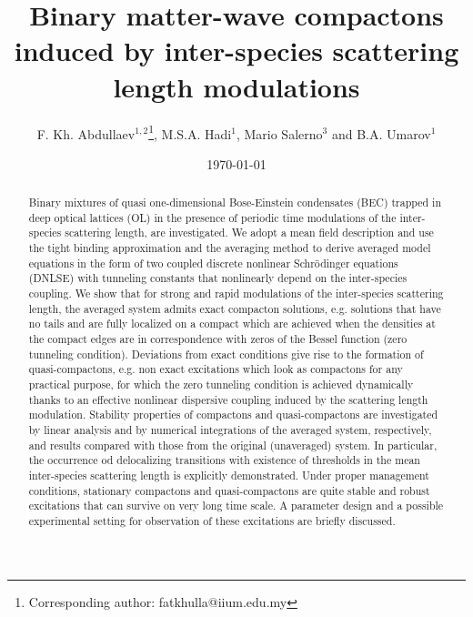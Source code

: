 \documentclass[12pt]{iopart}
\begin{document}
\title{Binary matter-wave compactons induced by inter-species scattering length modulations}
\author{F. Kh. Abdullaev$^{1,2}$\footnote{{Corresponding author: fatkhulla@iium.edu.my}}, M.S.A. Hadi$^{1}$, Mario Salerno$^{3}$ and B.A. Umarov$^{1}$
}
\address{
$^1$ Department of Physics, Kulliyyah of Science, International Islamic University Malaysia, 25200,  Kuantan, Malaysia.\\
$^2$ CCNH, Universidade Federal do ABC, 09210-170, Santo Andr\'e, Brazil.\\
$^3$ Dipartimento di Fisica ``E.R. Caianiello'', CNISM and INFN
- Gruppo Collegato di Salerno, Universit\'a di Salerno, Via Giovanni
Paolo II, 84084 Fisciano (SA), Italy.\\
}
\date{\today}

\begin{abstract}
Binary mixtures of quasi one-dimensional Bose-Einstein condensates
(BEC) trapped in deep optical lattices (OL) in the presence of periodic time
modulations of the inter-species scattering length, are investigated. We adopt a mean field description and use  the tight binding approximation and the  averaging method to
derive averaged model equations in the form of two coupled discrete nonlinear Schr\"odinger
equations (DNLSE) with tunneling constants that nonlinearly depend on the inter-species coupling.
We show that for strong and rapid modulations of the inter-species scattering length, the averaged system admits exact compacton solutions, e.g. solutions that have no tails and are fully localized on a compact  which are achieved when the densities at the compact edges are in correspondence with zeros of the Bessel function (zero tunneling condition). Deviations from  exact conditions  give rise to the formation of quasi-compactons, e.g. non exact excitations which look as compactons for  any practical purpose, for which the zero tunneling condition is achieved dynamically thanks to an effective nonlinear dispersive coupling induced by the scattering length modulation.  Stability properties of compactons and  quasi-compactons are investigated by linear analysis and by numerical integrations of the averaged system, respectively, and results compared with those from the original (unaveraged) system. In particular, the occurrence od delocalizing transitions with existence of thresholds in the mean inter-species scattering length  is explicitly demonstrated. Under
proper management conditions, stationary compactons and quasi-compactons are quite stable and
robust excitations that can survive on very long time scale. A parameter design and a possible experimental setting  for observation of these excitations  are briefly discussed.
\end{abstract}
\end{document}

